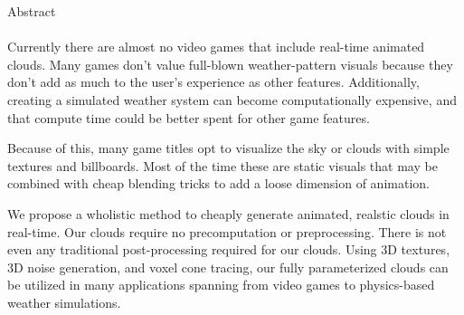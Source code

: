 \newpage
\begin{center}\Large{Abstract}\end{center}
\paragraph{}
Currently there are almost no video games that include real-time animated clouds. Many games don't value full-blown weather-pattern visuals because they don't add as much to the user's experience as other features. 
Additionally, creating a simulated weather system can become computationally expensive, and that compute time could be better spent for other game features. 

Because of this, many game titles opt to visualize the sky or clouds with simple textures and billboards. 
Most of the time these are static visuals that may be combined with cheap blending tricks to add a loose dimension of animation.

We propose a wholistic method to cheaply generate animated, realstic clouds in real-time. Our clouds require no precomputation or preprocessing. 
There is not even any traditional post-processing required for our clouds. Using 3D textures, 3D noise generation, and voxel cone tracing, our fully parameterized clouds can be utilized in many applications spanning from video games to physics-based weather simulations.


